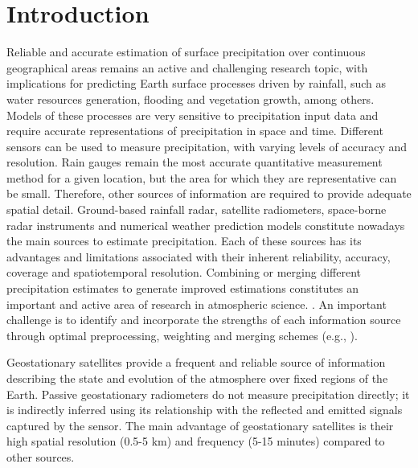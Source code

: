 \documentclass[3p,times]{elsarticle}
\begin{document}

\section{Introduction}
\label{}

Reliable and accurate estimation of surface precipitation over continuous geographical areas remains an active and challenging research topic, with implications for predicting Earth surface processes driven by rainfall, such as water resources generation, flooding and vegetation growth, among others. Models of these processes are very sensitive to precipitation input data and require accurate representations of precipitation in space and time. Different sensors can be used to measure precipitation, with varying levels of accuracy and resolution. Rain gauges remain the most accurate quantitative measurement method for a given location, but the area for which they are representative can be small. Therefore, other sources of information are required to provide adequate spatial detail. Ground-based rainfall radar, satellite radiometers, space-borne radar instruments and numerical weather prediction models constitute nowadays the main sources to estimate precipitation. Each of these sources has its advantages and limitations associated with their inherent reliability, accuracy, coverage and spatiotemporal resolution. Combining or merging different precipitation estimates to generate improved estimations constitutes an important and active area of research in atmospheric science. \citep{gourley2002exploratory,sideris2014real,nerini2015comparative,hasan2016merging}. An important challenge is to identify and incorporate the strengths of each information source through optimal preprocessing, weighting and merging schemes (e.g., \citep{beck2019mswep,beck2020evaluation}). 

Geostationary satellites provide a frequent and reliable source of information describing the state and evolution of the atmosphere over fixed regions of the Earth. Passive geostationary radiometers do not measure precipitation directly; it is indirectly inferred using its relationship with the reflected and emitted signals captured by the sensor. The main advantage of geostationary satellites is their high spatial resolution (0.5-5 km) and frequency (5-15 minutes) compared to other sources.
\end{document}
